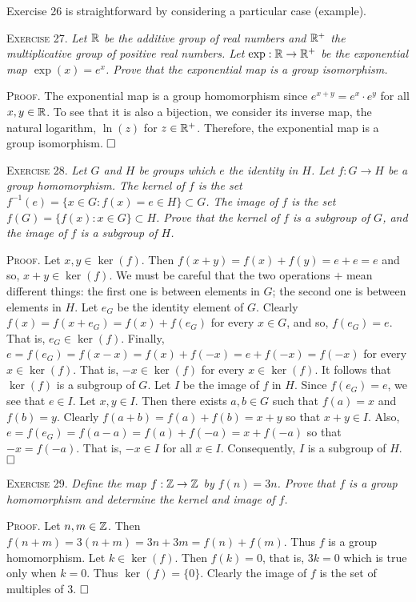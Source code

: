 \documentclass[11pt, leqno]{article}
\newcommand{\done}{\ensuremath{\hfill\square}}
\begin{document}
Exercise 26 is straightforward by considering a particular case (example).

\textsc{Exercise 27}. \emph{Let $\mathbb{R}$ be the additive group of real numbers and $\mathbb{R}^+$ the multiplicative group of positive real numbers. Let $\exp: \mathbb{R} \to \mathbb{R}^+$ be the exponential map $\exp(x) = e^x$. Prove that the exponential map is a group isomorphism.}

\textsc{Proof}. The exponential map is a group homomorphism since $e^{x+y}=e^x\cdot e^y$ for all $x,y \in \mathbb{R}$. To see that it is also a bijection, we consider its inverse map, the natural logarithm, $\ln(z)$ for $z\in\mathbb{R}^+$. Therefore, the exponential map is a group isomorphism. \done

\textsc{Exercise 28}. \emph{Let $G$ and $H$ be groups which $e$ the identity in $H$. Let $f:G\to H$ be a group homomorphism. The kernel of $f$ is the set $f^{-1}(e) = \{x\in G : f(x) = e \in H \} \subset G$. The image of $f$ is the set $f(G) = \{f(x) : x\in G\} \subset H$. Prove that the kernel of $f$ is a subgroup of $G$, and the image of $f$ is a subgroup of $H$.}

\textsc{Proof}. Let $x,y\in \ker(f)$. Then $f(x+y) = f(x) + f(y) = e + e = e$ and so, $x+y \in \ker(f)$. We must be careful that the two operations $+$ mean different things: the first one is between elements in $G$; the second one is between elements in $H$. Let $e_G$ be the identity element of $G$. Clearly $f(x) = f(x + e_G) = f(x) + f(e_G)$ for every $x \in G$, and so, $f(e_G) = e$. That is, $e_G \in \ker(f)$. Finally, $e = f(e_G) = f(x - x) = f(x) + f(-x) = e + f(-x) = f(-x)$ for every $x\in \ker(f)$. That is, $-x\in \ker(f)$ for every $x\in \ker(f)$. It follows that $\ker(f)$ is a subgroup of $G$. Let $I$ be the image of $f$ in $H$. Since $f(e_G) = e$, we see that $e\in I$. Let $x, y \in I$. Then there exists $a, b \in G$ such that $f(a) = x$ and $f(b) = y$. Clearly $f(a + b) = f(a) + f(b) = x + y$ so that $x+y \in I$. Also, $e = f(e_G) = f(a - a) = f(a) + f(-a) = x + f(-a)$ so that $-x = f(-a)$. That is, $-x \in I$ for all $x\in I$. Consequently, $I$ is a subgroup of $H$. \done

\textsc{Exercise 29}. \emph{Define the map $f: \mathbb{Z} \to \mathbb{Z}$ by $f(n)=3n$. Prove that $f$ is a group homomorphism and determine the kernel and image of $f$.}

\textsc{Proof}. Let $n,m \in \mathbb{Z}$. Then $f(n+m) = 3(n+m) = 3n + 3m = f(n) + f(m)$. Thus $f$ is a group homomorphism. Let $k\in \ker(f)$. Then $f(k) = 0$, that is, $3k = 0$ which is true only when $k=0$. Thus $\ker(f) = \{0\}$. Clearly the image of $f$ is the set of multiples of $3$. \done
\end{document}
